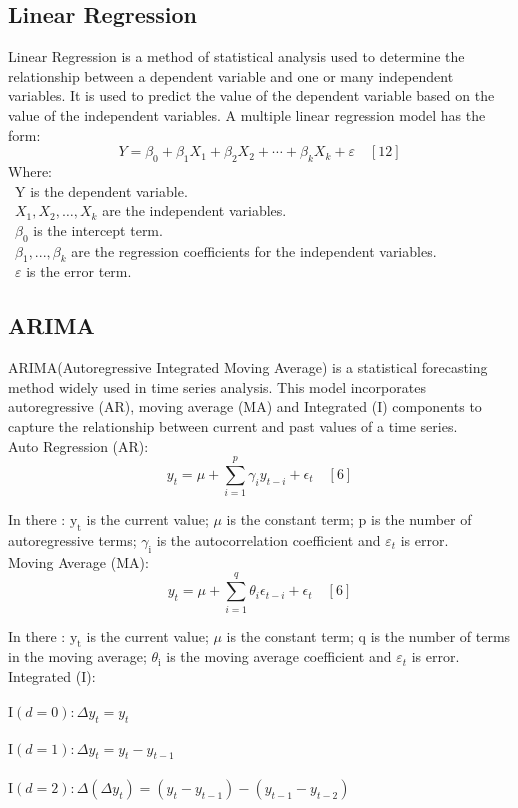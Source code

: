 \documentclass{ieeeojies}
\begin{document}
\subsection{Linear Regression}
Linear Regression is a method of statistical analysis used to determine the relationship between a dependent variable and one or many independent variables. It is used to predict the value of the dependent variable based on the value of the independent variables.
A multiple linear regression model has the form: 
\[Y=\beta_0+\beta_1X_1+\beta_2X_2+\cdots+\beta_kX_k+\varepsilon \quad[12]\]
Where:\\
	\indent\textbullet\ Y is the dependent variable.\\
	\indent\textbullet\ \(X_1, X_2, \ldots, X_k\) are the independent variables.\\
	\indent\textbullet\ \(\beta_0\) is the intercept term.\\
	\indent\textbullet\ \(\beta_1,..., \beta_k\) are the regression coefficients for the independent variables.\\
	\indent\textbullet\ \(\varepsilon\) is the error term.
 \subsection{ARIMA}
 ARIMA(Autoregressive Integrated Moving Average) is a statistical forecasting method widely used in time series analysis. This model incorporates autoregressive (AR), moving average (MA) and Integrated (I) components to capture the relationship between current and past values of a time series.\\
Auto Regression (AR): 
$$
y_t=\mu+\sum_{i=1}^p \gamma_i y_{t-i}+\epsilon_t \quad [6]
$$

In there : $\mathrm{y}_{\mathrm{t}}$ is the current value; $\mu$ is the constant term; $\mathrm{p}$ is the number of autoregressive terms; $\gamma_{\mathrm{i}}$ is the autocorrelation coefficient and $\varepsilon_{t}$ is error.\\
Moving Average (MA):
$$
y_t=\mu+\sum_{i=1}^q \theta_i \epsilon_{t-i}+\epsilon_t \quad [6]
$$

In there : $\mathrm{y}_{\mathrm{t}}$ is the current value; $\mu$ is the constant term; $\mathrm{q}$ is the number of terms in the moving average; $\theta_{\mathrm{i}}$ is the moving average coefficient  and $\varepsilon_{t}$ is error.\\
Integrated (I):\\
 \\$\mathrm{I}(d=0): \Delta y_t=y_t$\\
 \\$\mathrm{I}(d=1): \Delta y_t=y_t-y_{t-1}$\\
 \\$\mathrm{I}(d=2): \Delta\left(\Delta y_t\right)=\left(y_t-y_{t-1}\right)-\left(y_{t-1}-y_{t-2}\right)$ \\
 
\end{document}

